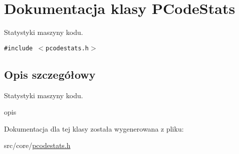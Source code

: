 \hypertarget{classPCodeStats}{
\section{Dokumentacja klasy PCodeStats}
\label{classPCodeStats}
}
Statystyki maszyny kodu.  


{\tt \#include $<$pcodestats.h$>$}



\subsection{Opis szczegółowy}
Statystyki maszyny kodu. 

opis 

Dokumentacja dla tej klasy została wygenerowana z pliku:\begin{CompactItemize}
\item 
src/core/\hyperlink{pcodestats_8h}{pcodestats.h}\end{CompactItemize}
